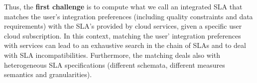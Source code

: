 \documentclass[11pt,a4paper,oneside]{report}
\begin{document}
Thus, the \textbf{first challenge} is to compute what we call an integrated SLA that matches the user's integration preferences (including quality constraints and data requirements) with the SLA's provided by cloud services, given a specific user cloud subscription. 
In this context, matching the user' integration preferences with services can lead to an exhaustive search in the chain of SLAs and to deal with SLA incompatibilities.
Furthermore, the matching deals also with heterogeneous SLA specifications (different schemata, different measures semantics and granularities).
%
%
\end{document}
